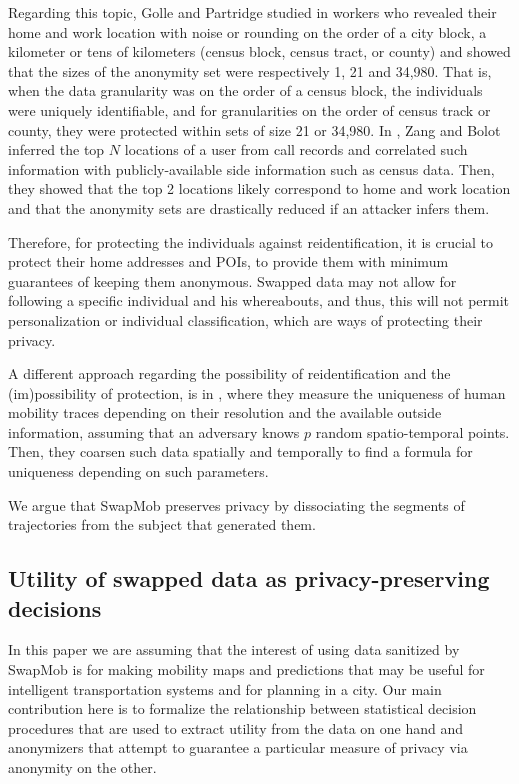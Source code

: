 \documentclass{llncs}
\begin{document}
Regarding this topic, Golle and Partridge studied in \cite{Golle:2009} workers who revealed their home and work location with noise or rounding on the order of a city block, a kilometer or tens of kilometers (census block, census tract, or county) and showed that the sizes of the anonymity set were respectively 1, 21 and 34,980. That is, when the data granularity was on the order of a census block, the individuals were uniquely identifiable, and for granularities on the order of census track or county, they were protected within sets of size 21 or 34,980.
In \cite{Zang:2011},  Zang and Bolot inferred the top $N$ locations of a user from call records and correlated such information with publicly-available side  information such as census data.  Then, they showed that the top 2 locations likely correspond to home and work location and that the anonymity sets are drastically reduced if an attacker infers them.

Therefore, for protecting the individuals against reidentification, it is crucial to protect their home addresses and POIs, to provide them with minimum guarantees of keeping them anonymous.
Swapped data may not allow for following a specific individual and his whereabouts, and thus, this will not permit personalization or individual classification, which are ways of protecting their privacy.

A different approach regarding the possibility of reidentification and the (im)possibility of protection, is in \cite{demontjoye2013}, where they measure the uniqueness of human mobility traces depending on their resolution and the available outside information, assuming that an adversary knows $p$ random spatio-temporal points. Then, they coarsen such data spatially and temporally to find a formula for uniqueness depending on such parameters.


We argue that SwapMob preserves privacy by dissociating the segments of trajectories from the subject that generated them.


\subsection{Utility of swapped data as privacy-preserving decisions}\label{sect:util}

In this paper we are assuming that the interest of using data sanitized by SwapMob is for making mobility maps and predictions that may be useful for intelligent transportation systems and for planning in a city.
Our main contribution here is to formalize the relationship between statistical decision procedures that are used to extract utility from the data on one hand and anonymizers that attempt to guarantee a particular measure of privacy via anonymity on the other.  
\end{document}
